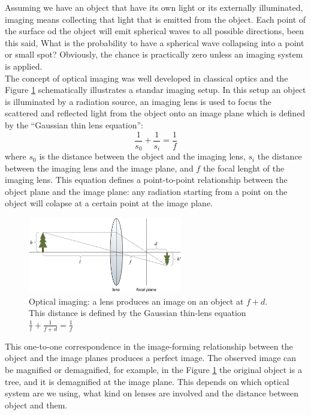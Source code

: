 Assuming we have an object that have its own light or its externally illuminated,
imaging means collecting that light that is emitted from the object. Each point
of the surface od the object will emit spherical waves to all possible directions,
been this said, What is the probability to have a spherical wave collapsing into a point or small spot? 
Obviously, the chance is practically zero unless an imaging system is applied.
\\
The concept of optical imaging was well developed in classical optics and the Figure
\ref{fig:imaging} schematically illustrates a standar imaging setup. In this setup 
an object is illuminated by a radiation source, an imaging lens is used 
to focus the scattered and reflected light from the object onto an image plane 
which is defined by the “Gaussian thin lens equation”\cite{hecht}:
\begin{equation}
\frac{1}{s_0}+\frac{1}{s_i}=\frac{1}{f}
\end{equation}
 where $s_0$ is the distance between the object and the imaging lens, $s_i$ the distance 
between the imaging lens and the image plane, and $f$ the focal lenght of the imaging lens. This equation defines
a point-to-point relationship between the object plane and the image plane: any radiation starting from a point on the object will colapse at a certain point at the image plane.
\\
\begin{figure}[h!]
\centering
\includegraphics[width=0.6\textwidth]{Figures/imaging.png}
\caption{Optical imaging: a lens produces an image on an object at $f+d$. This distance is defined
by the Gaussian thin-lens equation $\frac{1}{l}+\frac{1}{f+d}=\frac{1}{f}$} 
\label{fig:imaging}
\end{figure}
This one-to-one correspondence in the image-forming relationship between the object and the image planes produces a perfect image.
The observed image can be magnified or demagnified, for example, in the 
Figure \ref{fig:imaging} the original object is a tree, and it is demagnified at the image plane. This depends on which optical 
system are we using, what kind on lenses are involved and the distance between object and them.


